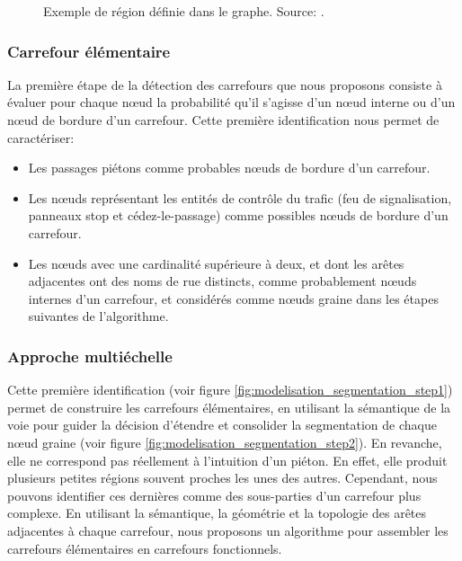 \begin{figure}[ht]
    \centering
    \caption[Régions du graphe de carrefour]{Exemple de région définie dans le graphe. Source: \citep{Favreau2022}.}
    \label{fig:modelisation_region_segmentation}
\end{figure}

\subsubsection{Carrefour élémentaire}

La première étape de la détection des carrefours que nous proposons consiste à évaluer pour chaque nœud la probabilité qu'il s'agisse d'un nœud interne ou d'un nœud de bordure d'un carrefour.
Cette première identification nous permet de caractériser:

\begin{itemize}
    \item Les passages piétons comme probables nœuds de bordure d'un carrefour.
    \item Les nœuds représentant les entités de contrôle du trafic (feu de signalisation, panneaux stop et cédez-le-passage) comme possibles nœuds de bordure d'un carrefour.
    \item Les nœuds avec une cardinalité supérieure à deux, et dont les arêtes adjacentes ont des noms de rue distincts, comme probablement nœuds internes d'un carrefour, et considérés comme nœuds graine dans les étapes suivantes de l'algorithme.
\end{itemize}

\subsubsection{Approche multiéchelle}

Cette première identification (voir figure \ref{fig:modelisation_segmentation_step1}) permet de construire les carrefours élémentaires, en utilisant la sémantique de la voie pour guider la décision d'étendre et consolider la segmentation de chaque nœud graine (voir figure \ref{fig:modelisation_segmentation_step2}). En revanche, elle ne correspond pas réellement à l'intuition d'un piéton. En effet, elle produit plusieurs petites régions souvent proches les unes des autres. Cependant, nous pouvons identifier ces dernières comme des sous-parties d'un carrefour plus complexe. En utilisant la sémantique, la géométrie et la topologie des arêtes adjacentes à chaque carrefour, nous proposons un algorithme pour assembler les carrefours élémentaires en carrefours fonctionnels.

